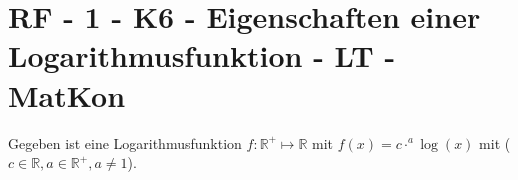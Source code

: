 \section{RF - 1 - K6 - Eigenschaften einer Logarithmusfunktion - LT - MatKon}

\begin{beispiel}[RF]{1}
				Gegeben ist eine Logarithmusfunktion $f:\mathbb{R}^+\mapsto\mathbb{R}$ mit $f(x)=c\cdot^a\log(x)$ mit ($c\in\mathbb{R}, a\in\mathbb{R}^+, a\neq 1$).

\end{beispiel}